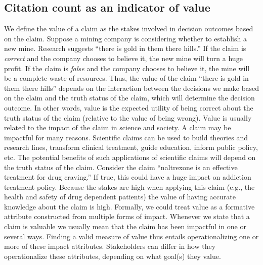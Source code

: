 \documentclass[
  english,
  jou,floatsintext]{apa6}
\begin{document}
\hypertarget{citation-count-as-an-indicator-of-value}{%
\subsection{Citation count as an indicator of value}\label{citation-count-as-an-indicator-of-value}}

We define the value of a claim as the stakes involved in decision outcomes based on the claim. Suppose a mining company is considering whether to establish a new mine. Research suggests ``there is gold in them there hills.'' If the claim is \emph{correct} and the company chooses to believe it, the new mine will turn a huge profit. If the claim is \emph{false} and the company chooses to believe it, the mine will be a complete waste of resources. Thus, the value of the claim ``there is gold in them there hills'' depends on the interaction between the decisions we make based on the claim and the truth status of the claim, which will determine the decision outcome. In other words, value is the expected utility of being correct about the truth status of the claim (relative to the value of being wrong). Value is usually related to the impact of the claim in science and society. A claim may be impactful for many reasons. Scientific claims can be used to build theories and research lines, transform clinical treatment, guide education, inform public policy, etc. The potential benefits of such applications of scientific claims will depend on the truth status of the claim. Consider the claim ``naltrexone is an effective treatment for drug craving.'' If true, this could have a huge impact on addiction treatment policy. Because the stakes are high when applying this claim (e.g., the health and safety of drug dependent patients) the value of having accurate knowledge about the claim is high. Formally, we could treat value as a formative attribute constructed from multiple forms of impact. Whenever we state that a claim is valuable we usually mean that the claim has been impactful in one or several ways. Finding a valid measure of value thus entails operationalizing one or more of these impact attributes. Stakeholders can differ in how they operationalize these attributes, depending on what goal(s) they value.
\end{document}
